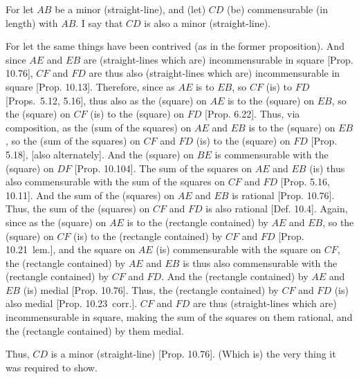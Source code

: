 \begin{Parallel}{}{}
{For let $AB$ be a minor (straight-line), and (let) $CD$ (be) commensurable
(in length) with $AB$. I say that $CD$ is also a minor (straight-line).

For let the same things have been contrived (as in the former proposition).
And since $AE$ and $EB$ are (straight-lines which are) incommensurable in square [Prop. 10.76], $CF$ and $FD$ are thus also
(straight-lines which are)  incommensurable in square [Prop. 10.13].
Therefore, since as $AE$ is to $EB$, so $CF$ (is) to $FD$ [Props.~5.12, 5.16], thus also
as the (square) on $AE$ is to the (square) on $EB$, so the (square)
on $CF$ (is) to the (square) on $FD$ [Prop. 6.22]. Thus, via composition,
as the (sum of the squares) on $AE$ and $EB$ is to the (square) on $EB$,
so the (sum of the squares) on $CF$ and $FD$  (is) to the (square) on $FD$  [Prop. 5.18], [also alternately]. And the
(square) on $BE$ is commensurable with the (square) on $DF$ [Prop. 10.104]. The sum of the squares on $AE$ and $EB$ (is) thus also commensurable with the sum of the squares
on $CF$ and $FD$ [Prop. 5.16, 10.11].  And the sum of the (squares) on
$AE$ and $EB$ is rational [Prop. 10.76].
Thus, the sum of the (squares) on $CF$ and $FD$ is also rational
[Def. 10.4]. Again, since as the (square) on $AE$
is to the (rectangle contained) by $AE$ and $EB$, so
the (square) on $CF$ (is) to the (rectangle contained) by
$CF$ and $FD$ [Prop. 10.21~lem.],
and the square on $AE$ (is) commensurable with the square on
$CF$, the (rectangle contained) by $AE$ and $EB$ is thus also commensurable
with the (rectangle contained) by $CF$ and $FD$. And the
(rectangle contained) by $AE$ and $EB$ (is) medial [Prop. 10.76].  Thus, the (rectangle contained) by
$CF$ and $FD$ (is) also medial [Prop. 10.23~corr.]. $CF$ and $FD$
are thus (straight-lines which are) incommensurable in square, making the sum of the
squares on them rational, and the (rectangle contained) by them
medial.

Thus, $CD$ is a minor (straight-line) [Prop. 10.76]. (Which is) the very thing it
was required to show.}
\end{Parallel}

